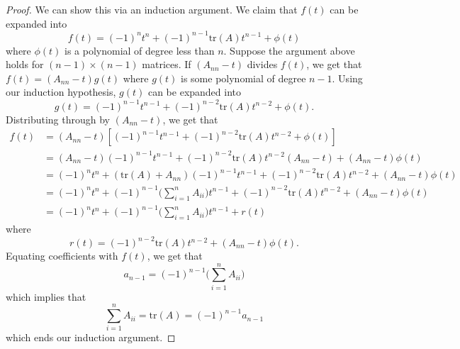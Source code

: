 \begin{enumerate}
\begin{proof}
        We can show this via an induction argument. We claim that \( f(t) \) can be expanded into 
        \[  f(t) = (-1)^{n} t^{n} + (-1)^{n-1} \text{tr}(A) t^{n-1} + \phi(t) \]
        where \( \phi(t) \) is a polynomial of degree less than \( n  \).
        Suppose the argument above holds for \( (n - 1) \times (n-1)  \) matrices. If \( ({A}_{n n } - t) \) divides \( f(t) \), we get that \( f(t) = ({A}_{n n } - t) g(t) \) where \( g(t) \) is some polynomial of degree \( n - 1 \). Using our induction hypothesis, \( g(t) \) can be expanded into 
        \[  g(t) = (-1)^{n-1} t^{n-1} + (-1)^{n-2} \text{tr}(A) t^{n-2} + \phi(t). \]
        Distributing through by \( ({A}_{n n } -t) \), we get that
        \begin{align*}
            f(t) &= ({A}_{n n } - t) [(-1)^{n-1} t^{n-1} + (-1)^{n-2} \text{tr}(A) t^{n-2} + \phi(t)] \\
                 &= ({A}_{n n } -t) (-1)^{n-1} t^{n-1} + (-1)^{n-2}  \text{tr}(A) t^{n-2} ({A}_{n n} -t) + ({A}_{n n} -t)\phi(t) \\
                 &= (-1)^{n} t^{n} + (\text{tr}(A) + {A}_{nn}) (-1)^{n-1}t^{n-1} + (-1)^{n-2}\text{tr}(A) t^{n-2} + ({A}_{nn} - t) \phi(t) \\
                 &= (-1)^{n} t^{n} + (-1)^{n-1}\Big( \sum_{ i=1 }^{ n } {A}_{ii} \Big) t^{n-1} + (-1)^{n-2} \text{tr}(A) t^{n-2} + ({A}_{nn} -t)\phi(t) \\
                 &= (-1)^{n} t^{n} + (-1)^{n-1} \Big( \sum_{ i=1 }^{ n } {A}_{ii} \Big) t^{n-1} + r(t)
        \end{align*}
        where
        \[ r(t) = (-1)^{n-2}\text{tr}(A) t^{n-2} + ({A}_{nn} -t)\phi(t). \]
        Equating coefficients with \( f(t) \), we get that 
        \[  {a}_{n-1} = (-1)^{n-1} \Big( \sum_{ i=1 }^{ n } {A}_{ii} \Big) \]
        which implies that
        \[ \sum_{ i=1 }^{ n } {A}_{ii} = \text{tr}(A) = (-1)^{n-1}{a}_{n-1}  \]
        which ends our induction argument.
\end{proof}
\end{enumerate}


